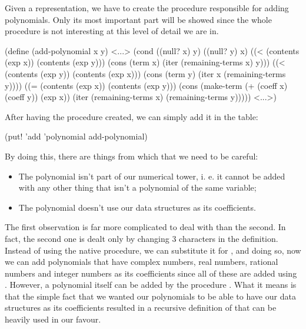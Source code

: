 
Given a representation, we have to create the procedure responsible for adding polynomials. Only its most important part will be showed since the whole procedure is not interesting at this level of detail we are in.

\begin{code}
(define (add-polynomial x y)
  <...>
  (cond ((null? x) y)
        ((null? y) x)
        ((< (contents (exp x)) (contents (exp y)))
         (cons (term x) (iter (remaining-terms x) y)))
        ((< (contents (exp y)) (contents (exp x)))
         (cons (term y) (iter x (remaining-terms y))))
        ((= (contents (exp x)) (contents (exp y)))
         (cons (make-term (+ (coeff x) (coeff y))
                          (exp x))
               (iter (remaining-terms x) (remaining-terms y)))))
    <...>)
\end{code}

After having the procedure created, we can simply add it in the table:

\begin{code}
(put! 'add 'polynomial add-polynomial)
\end{code}

By doing this, there are things from which that we need to be careful:

\begin{itemize}
  \item The polynomial isn't part of our numerical tower, i. e. it cannot be added with any other thing that isn't a polynomial of the same variable;
  \item The polynomial doesn't use our data structures as its coefficients.
\end{itemize}

The first observation is far more complicated to deal with than the second. In fact, the second one is dealt only by changing 3 characters in the  definition. Instead of using the native \var{+} procedure, we can substitute it for , and doing so, now we can add polynomials that have complex numbers, real numbers, rational numbers and integer numbers as its coefficients since all of these are added using . However, a polynomial itself can be added by the procedure . What it means is that the simple fact that we wanted our polynomials to be able to have our data structures as its coefficients resulted in a recursive definition of  that can be heavily used in our favour.

